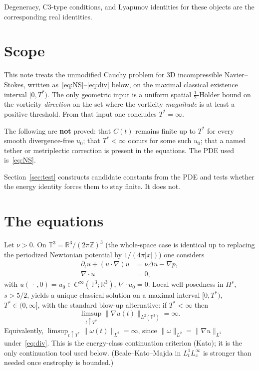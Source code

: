 \documentclass[11pt,a4paper]{article}
\theoremstyle{definition}
\theoremstyle{remark}
\newcommand{\R}{\mathbb{R}}
\newcommand{\T}{\mathbb{T}}
\newcommand{\Z}{\mathbb{Z}}
\newcommand{\abs}[1]{\lvert#1\rvert}
\newcommand{\norm}[1]{\lVert#1\rVert}
\begin{document}
Degeneracy, C3-type conditions, and Lyapunov identities for these
objects are the corresponding real identities.

\section{Scope}

This note treats the unmodified Cauchy problem for 3D incompressible
Navier--Stokes, written as~\eqref{eq:NS}--\eqref{eq:div} below, on the
maximal classical existence interval \([0,T^*)\). The only geometric
input is a uniform spatial \(\tfrac12\)-H\"older bound on the vorticity
\emph{direction} on the set where the vorticity \emph{magnitude} is at
least a positive threshold. From that input one concludes \(T^*=\infty\).

The following are \textbf{not} proved: that \(C(t)\) remains finite up to
\(T^*\) for every smooth divergence-free \(u_0\); that \(T^*<\infty\)
occurs for some such \(u_0\); that a named tether or metriplectic
correction is present in the equations. The PDE used is~\eqref{eq:NS}.

Section~\ref{sec:test} constructs candidate constants from the PDE and
tests whether the energy identity forces them to stay finite. It does not.

\section{The equations}

Let \(\nu>0\). On \(\T^3=\R^3/(2\pi\Z)^3\) (the whole-space case is
identical up to replacing the periodized Newtonian potential by
\(1/(4\pi\abs{x})\)) one considers
\begin{align}
\partial_t u+(u\cdot\nabla)u&=\nu\Delta u-\nabla p,
\label{eq:NS}\\
\nabla\cdot u&=0,
\label{eq:div}
\end{align}
with \(u(\,\cdot\,,0)=u_0\in C^\infty(\T^3;\R^3)\), \(\nabla\cdot u_0=0\).
Local well-posedness in \(H^s\), \(s>5/2\), yields a unique classical
solution on a maximal interval \([0,T^*)\), \(T^*\in(0,\infty]\), with
the standard blow-up alternative: if \(T^*<\infty\) then
\begin{equation}
\label{eq:H1blowup}
\limsup_{t\uparrow T^*}\norm{\nabla u(t)}_{L^2(\T^3)}=\infty.
\end{equation}
Equivalently, \(\limsup_{t\uparrow T^*}\norm{\omega(t)}_{L^2}=\infty\),
since \(\norm{\omega}_{L^2}=\norm{\nabla u}_{L^2}\) under~\eqref{eq:div}.
This is the energy-class continuation criterion (Kato); it is the only
continuation tool used below. (Beale--Kato--Majda in \(L^1_tL^\infty_x\)
is stronger than needed once enstrophy is bounded.)
\end{document}
